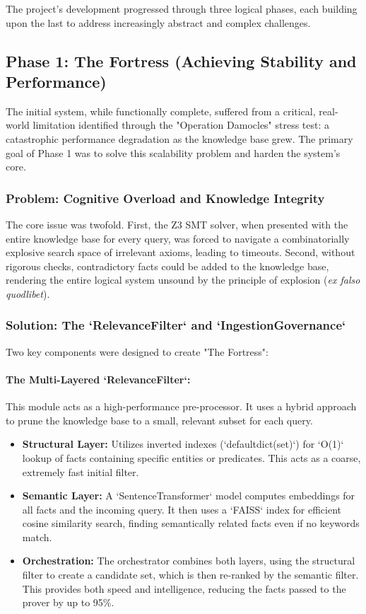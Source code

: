 \documentclass[11pt, a4paper]{article}
\begin{document}
The project's development progressed through three logical phases, each building upon the last to address increasingly abstract and complex challenges.

\subsection{Phase 1: The Fortress (Achieving Stability and Performance)}
\label{subsec:fortress}

The initial system, while functionally complete, suffered from a critical, real-world limitation identified through the "Operation Damocles" stress test: a catastrophic performance degradation as the knowledge base grew. The primary goal of Phase 1 was to solve this scalability problem and harden the system's core.

\subsubsection{Problem: Cognitive Overload and Knowledge Integrity}
The core issue was twofold. First, the Z3 SMT solver, when presented with the entire knowledge base for every query, was forced to navigate a combinatorially explosive search space of irrelevant axioms, leading to timeouts. Second, without rigorous checks, contradictory facts could be added to the knowledge base, rendering the entire logical system unsound by the principle of explosion (\textit{ex falso quodlibet}).

\subsubsection{Solution: The `RelevanceFilter` and `IngestionGovernance`}
Two key components were designed to create "The Fortress":

\paragraph{The Multi-Layered `RelevanceFilter`:} This module acts as a high-performance pre-processor. It uses a hybrid approach to prune the knowledge base to a small, relevant subset for each query.
\begin{itemize}
    \item \textbf{Structural Layer:} Utilizes inverted indexes (`defaultdict(set)`) for `O(1)` lookup of facts containing specific entities or predicates. This acts as a coarse, extremely fast initial filter.
    \item \textbf{Semantic Layer:} A `SentenceTransformer` model computes embeddings for all facts and the incoming query. It then uses a `FAISS` index for efficient cosine similarity search, finding semantically related facts even if no keywords match.
    \item \textbf{Orchestration:} The orchestrator combines both layers, using the structural filter to create a candidate set, which is then re-ranked by the semantic filter. This provides both speed and intelligence, reducing the facts passed to the prover by up to 95\%.
\end{itemize}
\end{document}
